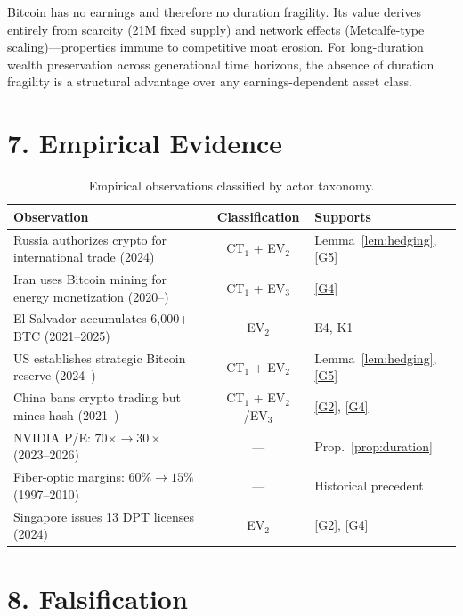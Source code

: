 \documentclass[12pt]{article}
\theoremstyle{definition}
\theoremstyle{remark}
\begin{document}
Bitcoin has no earnings and therefore no duration fragility. Its value
derives entirely from scarcity (21M fixed supply) and network effects
(Metcalfe-type scaling)---properties immune to competitive moat erosion.
For long-duration wealth preservation across generational time horizons,
the absence of duration fragility is a structural advantage over any
earnings-dependent asset class.

\section{7. Empirical Evidence}\label{sec:evidence}

\begin{table}[h]
\centering
\small
\begin{tabular}{@{}p{5cm}cp{3.2cm}@{}}
\toprule
Observation & Classification & Supports \\
\midrule
Russia authorizes crypto for international trade (2024)
  & CT$_1$ + EV$_2$
  & Lemma~\ref{lem:hedging}, \ref{G5} \\[3pt]
Iran uses Bitcoin mining for energy monetization (2020--)
  & CT$_1$ + EV$_3$
  & \ref{G4} \\[3pt]
El Salvador accumulates 6{,}000+ BTC (2021--2025)
  & EV$_2$
  & E4, K1 \\[3pt]
US establishes strategic Bitcoin reserve (2024--)
  & CT$_1$ + EV$_2$
  & Lemma~\ref{lem:hedging}, \ref{G5} \\[3pt]
China bans crypto trading but mines hash (2021--)
  & CT$_1$ + EV$_2$/EV$_3$
  & \ref{G2}, \ref{G4} \\[3pt]
NVIDIA P/E: $70\times \to 30\times$ (2023--2026)
  & ---
  & Prop.~\ref{prop:duration} \\[3pt]
Fiber-optic margins: $60\% \to 15\%$ (1997--2010)
  & ---
  & Historical precedent \\[3pt]
Singapore issues 13 DPT licenses (2024)
  & EV$_2$
  & \ref{G2}, \ref{G4} \\
\bottomrule
\end{tabular}
\caption{Empirical observations classified by actor taxonomy.}
\label{tab:evidence}
\end{table}

\section{8. Falsification}\label{sec:falsification}
\end{document}
